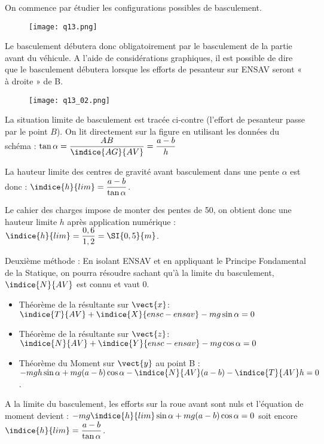 \ifprof
\begin{corrige}
On commence par étudier les configurations possibles de basculement. 

\begin{figure}[H]
\centering
\texttt{[image: q13.png]}
\end{figure}

Le basculement débutera donc obligatoirement par le basculement de la partie avant du véhicule.
A l’aide de considérations graphiques, il est possible de dire que le basculement débutera lorsque les efforts de pesanteur sur ENSAV seront « à droite » de B.

\begin{figure}[H]
\centering
\texttt{[image: q13\_02.png]}
\end{figure}


La situation limite de basculement est tracée ci-contre (l’effort de pesanteur passe par le point $B$).
On lit directement sur la figure en utilisant les données du schéma : $\tan\alpha = \dfrac{AB}{\indice{AG}{AV}}= \dfrac{a-b}{h}$

La hauteur limite des centres de gravité avant basculement dans une pente $\alpha$ est donc :
$\indice{h}{lim}=\dfrac{a-b}{\tan \alpha}$.

Le cahier des charges impose de monter des pentes de 50\degres, on obtient donc une hauteur limite $h$ après application numérique : $\indice{h}{lim} = \dfrac{0,6}{1,2}=\SI{0,5}{m}$.


Deuxième méthode : 
En isolant ENSAV et en appliquant le Principe Fondamental de la Statique, on pourra résoudre sachant qu’à la limite du basculement, $\indice{N}{AV}$ est connu et vaut 0.
 

\begin{itemize}
\item Théorème de la résultante sur $\vect{x}$: $\indice{T}{AV}+\indice{X}{ensc-ensav}-mg \sin \alpha=0$
\item Théorème de la résultante sur $\vect{z}$: $\indice{N}{AV}+\indice{Y}{ensc-ensav}-mg \cos \alpha=0$
\item Théorème du Moment sur $\vect{y}$ au point B : $-mgh \sin\alpha+mg(a-b)\cos\alpha -\indice{N}{AV} (a-b)-\indice{T}{AV} h=0$.
\end{itemize}

A la limite du basculement, les efforts sur la roue avant sont nuls et l’équation de moment devient :
$-mg\indice{h}{lim}  \sin\alpha + mg(a-b) \cos \alpha =0$ soit encore $\indice{h}{lim} = \dfrac{a-b}{\tan \alpha}$.


\end{corrige}
\else
\fi


